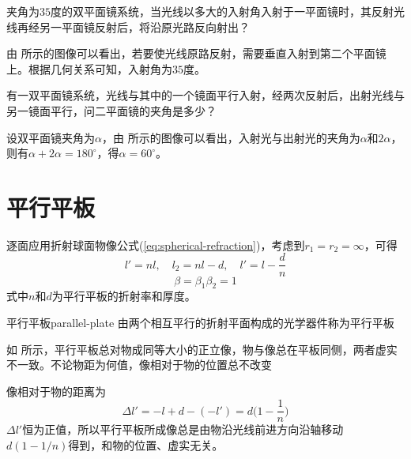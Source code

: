 \documentclass[cn,10pt,chinesefont=founder,math=mtpro2,cite=super,toc=onecol,twoside,openany]{elegantbook}
\begin{document}
\begin{problem}
	夹角为$35$度的双平面镜系统，当光线以多大的入射角入射于一平面镜时，其反射光线再经另一平面镜反射后，将沿原光路反向射出？
\end{problem}
\begin{solution}
	由 所示的图像可以看出，若要使光线原路反射，需要垂直入射到第二个平面镜上。根据几何关系可知，入射角为$35$度。
\end{solution}

\begin{problem}
	有一双平面镜系统，光线与其中的一个镜面平行入射，经两次反射后，出射光线与另一镜面平行，问二平面镜的夹角是多少？
\end{problem}
\begin{solution}
	设双平面镜夹角为$\alpha$，由 所示的图像可以看出，入射光与出射光的夹角为$\alpha$和$2\alpha$，则有$\alpha+2\alpha=180^{\circ}$，得$\alpha=60^{\circ}$。
\end{solution}

\section{平行平板}
\label{sect:parallel-plate}

逐面应用折射球面物像公式(\ref{eq:spherical-refraction})，考虑到$r_1=r_2=\infty$，可得
\begin{equation}
l'=nl,\quad l_2=nl-d,\quad l'=l-\frac{d}{n}
\end{equation}
\begin{equation}
\beta=\beta_1\beta_2=1
\end{equation}
式中$n$和$d$为平行平板的折射率和厚度。

\begin{definition}{平行平板}{parallel-plate}
	由两个相互平行的折射平面构成的光学器件称为平行平板
\end{definition}

\begin{property}
如 所示，平行平板总对物成同等大小的正立像，物与像总在平板同侧，两者虚实不一致。不论物距为何值，像相对于物的位置总不改变
\end{property}

像相对于物的距离为
\begin{equation}
\Delta l'=-l+d-(-l')=d\bigg(1-\frac{1}{n}\bigg)
\end{equation}
$\Delta l'$恒为正值，所以平行平板所成像总是由物沿光线前进方向沿轴移动$d(1-1/n)$得到，和物的位置、虚实无关。
\end{document}
